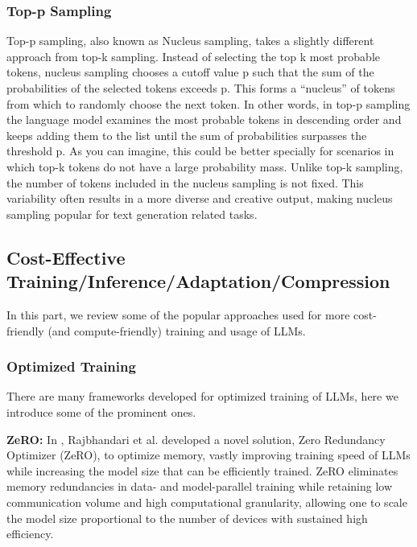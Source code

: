 \documentclass[conference]{IEEEtran}
\begin{document}
\subsubsection{\textbf{Top-p Sampling}}
Top-p sampling, also known as Nucleus sampling, takes a slightly different approach from top-k sampling. Instead of selecting the top k most probable tokens, nucleus sampling chooses a cutoff value p such that the sum of the probabilities of the selected tokens exceeds p. This forms a “nucleus” of tokens from which to randomly choose the next token. In other words, in top-p sampling the language model examines the most probable tokens in descending order and keeps adding them to the list until the sum of probabilities surpasses the threshold p.
As you can imagine, this could be better specially for scenarios in which top-k tokens do not have a large probability mass.
Unlike top-k sampling, the number of tokens included in the nucleus sampling is not fixed. This variability often results in a more diverse and creative output, making nucleus sampling popular for text generation related tasks.



\subsection{Cost-Effective Training/Inference/Adaptation/Compression}\label{sub:cost-effective}
In this part, we review some of the popular approaches used for more cost-friendly (and compute-friendly) training and usage of LLMs.

\subsubsection{\textbf{Optimized Training}}
There are many frameworks developed for optimized training of LLMs, here we introduce some of the prominent ones.

\textbf{ZeRO: } In \cite{rajbhandari2020zero}, Rajbhandari et al. developed a novel solution, Zero Redundancy Optimizer (ZeRO), to optimize memory, vastly improving training speed of LLMs while increasing the model size that can be efficiently trained. ZeRO eliminates memory redundancies in data- and model-parallel training while retaining low communication volume and high computational granularity, allowing one to scale the model size proportional to the number of devices with sustained high efficiency. 
\end{document}
